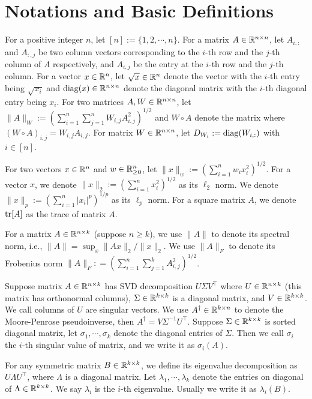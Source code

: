 \section{Notations and Basic Definitions}\label{sec:notation_definition}

For a positive integer $n$, let $[ n ] := \{ 1, 2, \cdots, n\}$. For a matrix $A \in \mathbb{R}^{n \times n}$, let $A_{i, :}$ and $A_{:, j}$ be two column vectors corresponding to the $i$-th row and the $j$-th column of $A$ respectively, and $A_{i, j}$ be the entry at the $i$-th row and the $j$-th column. For a vector $x \in \mathbb{R}^n$, let $\sqrt{x} \in \mathbb{R}^{n}$ denote the vector with the $i$-th entry being $\sqrt{x_i}$ and $\operatorname{diag} ( x ) \in \mathbb{R}^{n \times n}$ denote the diagonal matrix with the $i$-th diagonal entry being $x_i$. For two matrices $A, W \in \mathbb{R}^{n \times n}$, let $\| A \|_W := (\sum_{i=1}^n \sum_{j=1}^n W_{i, j} A_{i, j}^2)^{1/2}$ and $W \circ A$ denote the matrix where $(W \circ A)_{i,j} = W_{i,j} A_{i,j}$. For matrix $W \in \mathbb{R}^{n \times n}$, let $D_{W_i} := \operatorname{diag}( W_{i, :} )$ with $i \in [n]$. 

For two vectors $x \in \mathbb{R}^n$ and $w \in \mathbb{R}^n_{\geq 0}$, let $\| x\|_w := (\sum_{i=1}^n w_i x_i^2)^{1/2}$.   For a vector $x$, we denote $\| x \|_2 := ( \sum_{i=1}^n x_i^2 )^{1/2}$ as its $\ell_2$ norm. We denote $\| x \|_p := (\sum_{i=1}^n |x_i|^p)^{1/p}$ as its $\ell_p$ norm. For a square matrix $A$, we denote $\operatorname{tr}[A]$ as the trace of matrix $A$. 

For a matrix $A \in \mathbb{R}^{n \times k}$ (suppose $n \geq k$), we use $\| A \|$ to denote its spectral norm, i.e., $\| A \| = \sup_{x} \| A x \|_2 / \| x \|_2$. We use $\| A \|_F$ to denote its Frobenius norm $\| A \|_F : = (\sum_{i=1}^n \sum_{j=1}^k A_{i,j}^2 )^{1/2}$.

Suppose matrix $A \in \mathbb{R}^{n \times k}$ has SVD decomposition $U \Sigma V^\top$ where $U \in \mathbb{R}^{n \times k}$ (this matrix has orthonormal columns), $\Sigma \in \mathbb{R}^{k \times k}$ is a diagonal matrix, and $V \in \mathbb{R}^{k \times k}$. We call columns of $U$ are singular vectors. We use $A^\dagger \in \mathbb{R}^{k \times n}$ to denote the Moore-Penrose pseudoinverse, then $A^\dagger = V \Sigma^{-1} U^\top$. Suppose $\Sigma \in \mathbb{R}^{k \times k}$ is sorted diagonal matrix, let $\sigma_1, \cdots, \sigma_k$ denote the diagonal entries of $\Sigma$. Then we call $\sigma_i$ the $i$-th singular value of matrix, and we write it as $\sigma_i(A)$.

For any symmetric matrix $B \in \mathbb{R}^{k \times k}$, we define its eigenvalue decomposition as $U \Lambda U^\top$, where $\Lambda$ is a diagonal matrix. Let $\lambda_1, \cdots, \lambda_k$ denote the entries on diagonal of $\Lambda \in \mathbb{R}^{k \times k}$. We say $\lambda_i$ is the $i$-th eigenvalue. Usually we write it as $\lambda_{i}(B)$.

